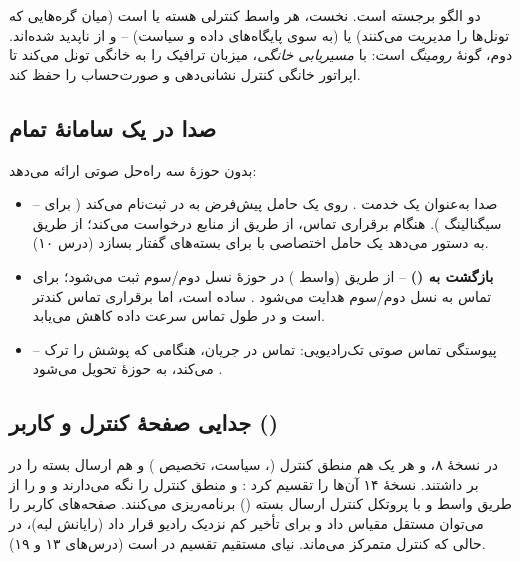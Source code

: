 \documentclass[11pt,a4paper]{article}
\begin{document}
دو الگو برجسته است. نخست، هر واسط کنترلی هسته یا  است (میان گره‌هایی که تونل‌ها را
مدیریت می‌کنند) یا  (به سوی پایگاه‌های داده و سیاست) --  و  از
 ناپدید شده‌اند. دوم،  گونهٔ \emph{رومینگ}  است: با \emph{مسیریابی خانگی}،
 میزبان ترافیک را به  خانگی تونل می‌کند تا اپراتور خانگی کنترل نشانی‌دهی  و
صورت‌حساب را حفظ کند.

\subsection{صدا در یک سامانهٔ تمام‌}
 بدون حوزهٔ  سه راه‌حل صوتی ارائه می‌دهد:
\begin{itemize}
  \item \textbf{} -- صدا به‌عنوان یک خدمت  \cite{ts23228}.  روی یک حامل
        پیش‌فرض به   در  ثبت‌نام می‌کند ( برای سیگنالینگ
        ). هنگام برقراری تماس،  از طریق  از  منابع درخواست
        می‌کند؛  از طریق  به  دستور می‌دهد یک حامل اختصاصی  با
         برای بسته‌های گفتار بسازد (درس ۱۰).
  \item \textbf{بازگشت به  ()} --  از طریق  (واسط ) در حوزهٔ
         نسل دوم/سوم ثبت می‌شود؛ برای تماس به نسل دوم/سوم هدایت می‌شود \cite{ts23272}. ساده
        است، اما برقراری تماس کندتر است و در طول تماس سرعت داده کاهش می‌یابد.
  \item \textbf{} -- پیوستگی تماس صوتی تک‌رادیویی: تماس  در جریان، هنگامی که
         پوشش  را ترک می‌کند، به حوزهٔ  تحویل می‌شود \cite{ts23216}.
\end{itemize}

\subsection{جدایی صفحهٔ کنترل و کاربر ()}
در نسخهٔ ۸،  و  هر یک هم منطق کنترل (، سیاست، تخصیص ) و هم ارسال
بسته را در بر داشتند. نسخهٔ ۱۴ آن‌ها را تقسیم کرد \cite{ts23214}:  و  منطق کنترل را
نگه می‌دارند و  و  را از طریق واسط  و با پروتکل کنترل ارسال بسته ()
\cite{ts29244} برنامه‌ریزی می‌کنند. صفحه‌های کاربر را می‌توان مستقل مقیاس داد و برای تأخیر کم نزدیک
رادیو قرار داد (رایانش لبه)، در حالی که کنترل متمرکز می‌ماند.  نیای مستقیم تقسیم
 در  است (درس‌های ۱۳ و ۱۹).
\end{document}
